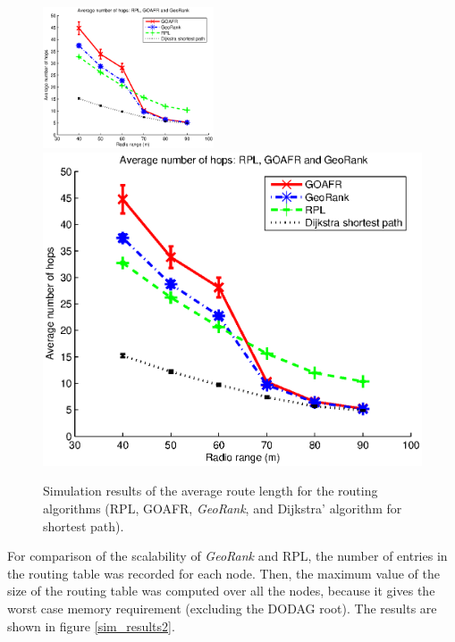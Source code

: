 \documentclass[final,authoryear,3p,twocolumn]{elsarticle}
\begin{document}
\begin{figure}
\centering
\ifdefined\TWOCOL
\includegraphics[width=0.45\textwidth]{figures/hops_range.eps}
\else
\includegraphics[width=1\textwidth]{figures/hops_range.eps}
\fi
\caption{Simulation results of the average route length for the routing algorithms (RPL, GOAFR, \textit{GeoRank}, and Dijkstra' algorithm for shortest path).}
\label{sim_results}
\end{figure}

For comparison of the scalability of \textit{GeoRank} and RPL, the number of entries in the routing table was recorded for each node. Then, the maximum value of the size of the routing table was computed over all the nodes, because it gives the worst case memory requirement (excluding the DODAG root). The results are shown in figure \ref{sim_results2}.
\end{document}
